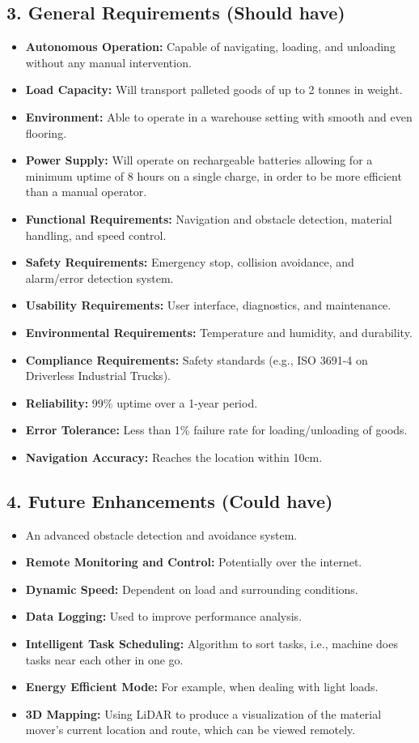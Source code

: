 \documentclass[12pt]{article}
\begin{document}
\subsection{3. General Requirements (Should have)}
\begin{itemize}
    \item \textbf{Autonomous Operation:} Capable of navigating, loading, and unloading without any manual intervention.
    \item \textbf{Load Capacity:} Will transport palleted goods of up to 2 tonnes in weight.
    \item \textbf{Environment:} Able to operate in a warehouse setting with smooth and even flooring.
    \item \textbf{Power Supply:} Will operate on rechargeable batteries allowing for a minimum uptime of 8 hours on a single charge, in order to be more efficient than a manual operator.
    \item \textbf{Functional Requirements:} Navigation and obstacle detection, material handling, and speed control.
    \item \textbf{Safety Requirements:} Emergency stop, collision avoidance, and alarm/error detection system.
    \item \textbf{Usability Requirements:} User interface, diagnostics, and maintenance.
    \item \textbf{Environmental Requirements:} Temperature and humidity, and durability.
    \item \textbf{Compliance Requirements:} Safety standards (e.g., ISO 3691-4 on Driverless Industrial Trucks).
    \item \textbf{Reliability:} 99\% uptime over a 1-year period.
    \item \textbf{Error Tolerance:} Less than 1\% failure rate for loading/unloading of goods.
    \item \textbf{Navigation Accuracy:} Reaches the location within 10cm.
\end{itemize}

\subsection{4. Future Enhancements (Could have)}
\begin{itemize}
    \item An advanced obstacle detection and avoidance system.
    \item \textbf{Remote Monitoring and Control:} Potentially over the internet.
    \item \textbf{Dynamic Speed:} Dependent on load and surrounding conditions.
    \item \textbf{Data Logging:} Used to improve performance analysis.
    \item \textbf{Intelligent Task Scheduling:} Algorithm to sort tasks, i.e., machine does tasks near each other in one go.
    \item \textbf{Energy Efficient Mode:} For example, when dealing with light loads.
    \item \textbf{3D Mapping:} Using LiDAR to produce a visualization of the material mover’s current location and route, which can be viewed remotely.
\end{itemize}
\end{document}
